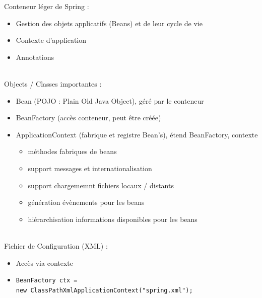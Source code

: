 \documentclass[11pt,twoside,a4paper]{article}
\begin{document}
\begin{landscape}
\begin{multicols}{2}
	
	
	
	\vfill
	\columnbreak
	
	Conteneur l{\'e}ger de Spring : 
	\begin{itemize}
		\item Gestion des objets applicatifs (Beans) et de leur cycle de vie
		\item Contexte d'application
		\item Annotations
	\end{itemize}~\\
	
	Objects / Classes importantes : 
	\begin{itemize}
		\item Bean (POJO : Plain Old Java Object), g{\'e}r{\'e} par le conteneur
		\item BeanFactory (acc{\`e}s conteneur, peut {\^e}tre cr{\'e}{\'e}e)
		\item ApplicationContext (fabrique et registre Bean's), {\'e}tend BeanFactory, contexte
		\begin{itemize}
			\item m{\'e}thodes fabriques de beans
			\item support messages et internationalisation
			\item support chargememnt fichiers locaux / distants
			\item g{\'e}n{\'e}ration {\'e}v{\`e}nements pour les beans
			\item hi{\'e}rarchisation informations disponibles pour les beans
		\end{itemize}
	\end{itemize}~\\
	
	Fichier de Configuration (XML) : 
	\begin{itemize}
		\item Accès via contexte
		\item \texttt{BeanFactory ctx =~\\
			new ClassPathXmlApplicationContext("spring.xml");}
	\end{itemize}~\\


\end{multicols}
\end{landscape}
\end{document}
